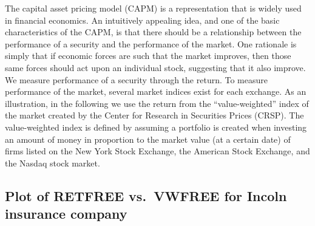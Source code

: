 \documentclass[]{book}
\begin{document}
The capital asset pricing model (CAPM) is a representation that is widely used in financial economics. An intuitively appealing idea, and one of the basic characteristics of the CAPM, is that there should be a relationship between the performance of a security and the performance of the market. One rationale is simply that if economic forces are such that the market improves, then those same forces should act upon an individual stock, suggesting that it also improve. We measure performance of a security through the return. To measure performance of the market, several market indices exist for each exchange. As an illustration, in the following we use the return from the ``value-weighted'' index of the market created by the Center for Research in Securities Prices (CRSP). The value-weighted index is defined by assuming a portfolio is created when investing an amount of money in proportion to the market value (at a certain date) of firms listed on the New York Stock Exchange, the American Stock Exchange, and the Nasdaq stock market.

\hypertarget{plot-of-retfree-vs.-vwfree-for-incoln-insurance-company}{%
\subsection{Plot of RETFREE vs.~VWFREE for Incoln insurance company}\label{plot-of-retfree-vs.-vwfree-for-incoln-insurance-company}}
\end{document}
